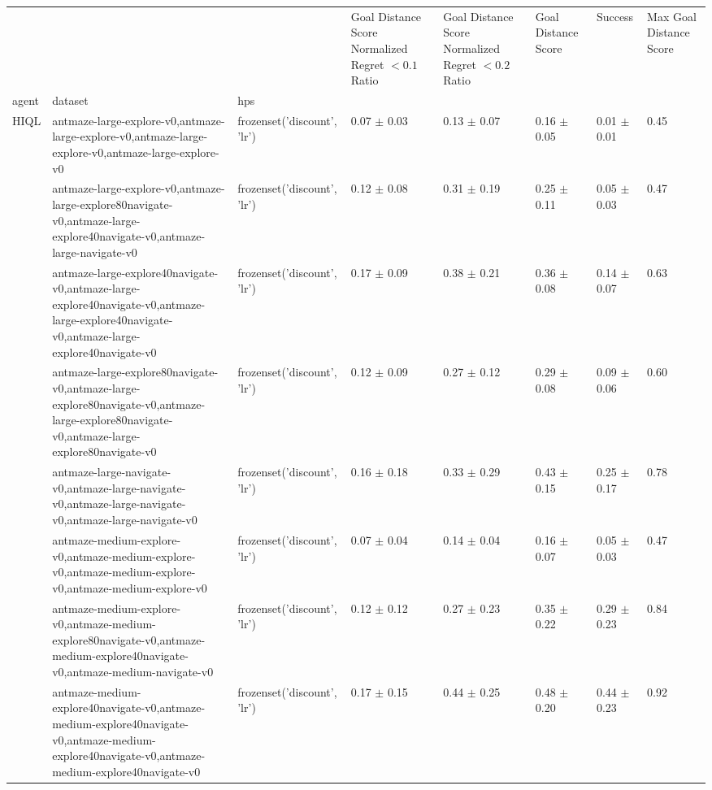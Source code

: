 \begin{tabular}{llllllll}
\toprule
 &  &  & Goal Distance Score Normalized Regret $< 0.1$ Ratio & Goal Distance Score Normalized Regret $< 0.2$ Ratio & Goal Distance Score & Success & Max Goal Distance Score \\
agent & dataset & hps &  &  &  &  &  \\
\midrule
\multirow[t]{10}{*}{HIQL} & antmaze-large-explore-v0,antmaze-large-explore-v0,antmaze-large-explore-v0,antmaze-large-explore-v0 & frozenset({'discount', 'lr'}) & 0.07 $\pm$ 0.03 & 0.13 $\pm$ 0.07 & 0.16 $\pm$ 0.05 & 0.01 $\pm$ 0.01 & 0.45 \\
\cline{2-8}
 & antmaze-large-explore-v0,antmaze-large-explore80navigate-v0,antmaze-large-explore40navigate-v0,antmaze-large-navigate-v0 & frozenset({'discount', 'lr'}) & 0.12 $\pm$ 0.08 & 0.31 $\pm$ 0.19 & 0.25 $\pm$ 0.11 & 0.05 $\pm$ 0.03 & 0.47 \\
\cline{2-8}
 & antmaze-large-explore40navigate-v0,antmaze-large-explore40navigate-v0,antmaze-large-explore40navigate-v0,antmaze-large-explore40navigate-v0 & frozenset({'discount', 'lr'}) & 0.17 $\pm$ 0.09 & 0.38 $\pm$ 0.21 & 0.36 $\pm$ 0.08 & 0.14 $\pm$ 0.07 & 0.63 \\
\cline{2-8}
 & antmaze-large-explore80navigate-v0,antmaze-large-explore80navigate-v0,antmaze-large-explore80navigate-v0,antmaze-large-explore80navigate-v0 & frozenset({'discount', 'lr'}) & 0.12 $\pm$ 0.09 & 0.27 $\pm$ 0.12 & 0.29 $\pm$ 0.08 & 0.09 $\pm$ 0.06 & 0.60 \\
\cline{2-8}
 & antmaze-large-navigate-v0,antmaze-large-navigate-v0,antmaze-large-navigate-v0,antmaze-large-navigate-v0 & frozenset({'discount', 'lr'}) & 0.16 $\pm$ 0.18 & 0.33 $\pm$ 0.29 & 0.43 $\pm$ 0.15 & 0.25 $\pm$ 0.17 & 0.78 \\
\cline{2-8}
 & antmaze-medium-explore-v0,antmaze-medium-explore-v0,antmaze-medium-explore-v0,antmaze-medium-explore-v0 & frozenset({'discount', 'lr'}) & 0.07 $\pm$ 0.04 & 0.14 $\pm$ 0.04 & 0.16 $\pm$ 0.07 & 0.05 $\pm$ 0.03 & 0.47 \\
\cline{2-8}
 & antmaze-medium-explore-v0,antmaze-medium-explore80navigate-v0,antmaze-medium-explore40navigate-v0,antmaze-medium-navigate-v0 & frozenset({'discount', 'lr'}) & 0.12 $\pm$ 0.12 & 0.27 $\pm$ 0.23 & 0.35 $\pm$ 0.22 & 0.29 $\pm$ 0.23 & 0.84 \\
\cline{2-8}
 & antmaze-medium-explore40navigate-v0,antmaze-medium-explore40navigate-v0,antmaze-medium-explore40navigate-v0,antmaze-medium-explore40navigate-v0 & frozenset({'discount', 'lr'}) & 0.17 $\pm$ 0.15 & 0.44 $\pm$ 0.25 & 0.48 $\pm$ 0.20 & 0.44 $\pm$ 0.23 & 0.92 \\

\end{tabular}
